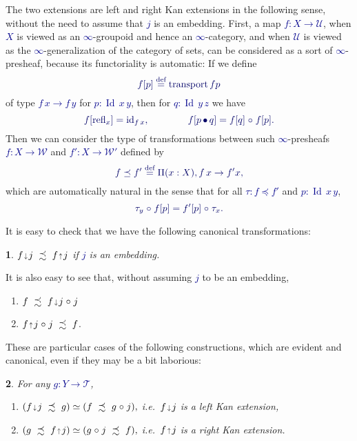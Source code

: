 \documentclass[10pt]{article}
\newcommand{\db}{\textcolor{darkblue}}
\newcommand{\m}[1]{\db{$#1$}}
\newcommand{\M}[1]{\[\db{#1}\]}
\newcommand{\pcomp}{\operatorname{\bullet}}
\newcommand{\transport}{\operatorname{transport}}
\newcommand{\id}{\operatorname{id}}
\newcommand{\comp}{\mathrel{\circ}}
\newcommand{\U}{\mathcal{U}}
\newcommand{\W}{\mathcal{W}}
\newcommand{\T}{\mathcal{T}}
\newcommand{\Id}{\operatorname{Id}}
\newcommand{\refl}{\operatorname{refl}}
\newcommand{\eqdef}{\overset{\text{def}}{=}}
\newcommand{\edown}{\scaleobj{0.7}{\,\downarrow\,}}
\newcommand{\eup}{\scaleobj{0.7}{\,\uparrow\,}}
\newcommand{\wps}{\mathrel{\,\,\precsim\,\,}}
\newtheorem{numbered}{}
\theoremstyle{definition}
\begin{document}
The two extensions are left and right Kan extensions in the following
sense, without the need to assume that \m{j} is an embedding. First, a
map \m{f:X \to \U}, when \m{X} is viewed as an \m{\infty}-groupoid and
hence an \m{\infty}-category, and when \m{\U} is viewed as the
\m{\infty}-generalization of the category of sets, can be considered
as a sort of \m{\infty}-presheaf, because its functoriality is
automatic: If we define
%
\M{f [ p ] \eqdef \transport f p}
%
of type \m{f\, x \to f\, y} for \m{p : \Id \, x \, y}, then for
\m{q : \Id \, y \, z} we have
%
\M{ f [
  \refl_x ] = \id_{f \, x}, \qquad\qquad f [p \pcomp q] = f [q] \comp f
  [p].
}
Then we can consider the type of transformations between such
\m{\infty}-presheafs \m{f : X \to \W} and \m{f' : X \to \W'} defined by
%
\M{
  f \preceq f' \eqdef \Pi (x : X), f \, x \to  f' x,
}
%
which are automatically natural in the sense that for all \m{\tau: f \preceq f'} and \m{p : \Id \, x \, y},
%
\M{
  \tau_y \comp f [ p ] = f' [p] \comp \tau_x.
}
%

It is easy to check that we have the following canonical transformations:
\begin{numbered}
  \m{f \edown j \wps f \eup j} if \m{j} is an embedding.
\end{numbered}
It is also easy to see that, without assuming \m{j} to be an embedding,
  \begin{enumerate}
  \item \m{f \wps f \edown j \comp j}
  \item \m{f \eup j \comp j \wps f}.
  \end{enumerate}
  These are particular cases of the following constructions, which are
  evident and canonical, even if they may be a bit
  laborious:
\begin{numbered} For any \m{g : Y \to \T},
    \begin{enumerate}
    \item \m{(f \edown j \wps g) \simeq (f \wps g \comp j),} \quad i.e.\ \m{f \edown j} is a left Kan extension,
    \item \m{(g \wps f \eup j) \simeq (g \comp j \wps f),} \quad i.e.\ \m{f \eup j} is a right Kan extension.
    \end{enumerate}
\end{numbered}
\end{document}
